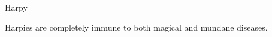 \begin{monsterbox}{Harpy}
\begin{rpg-monsteraction}
	\end{rpg-monsteraction}
	\begin{rpg-monsteraction}
		Harpies are completely immune to both magical and mundane diseases.
	\end{rpg-monsteraction}

\end{monsterbox}



